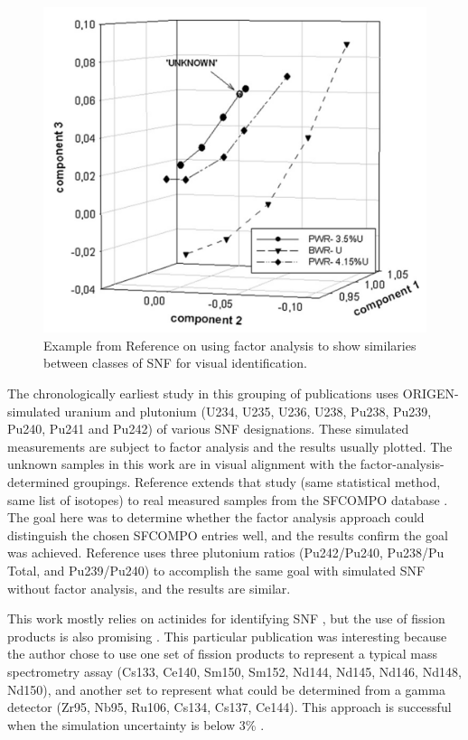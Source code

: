 \begin{figure}[!htb]
  \centering
  \includegraphics[width=0.5\linewidth]{./chapters/litrev/nicolaou.png}
  \caption{Example from Reference \cite{nicolaou_pu} on using factor analysis 
           to show similaries between classes of \gls{SNF} for visual 
           identification.}
  \label{fig:nico}
\end{figure}

The chronologically earliest study in this grouping of publications
\cite{nicolaou_2006} uses \gls{ORIGEN}-simulated uranium and plutonium (U234,
U235, U236, U238, Pu238, Pu239, Pu240, Pu241 and Pu242) of various \gls{SNF}
designations.  These simulated measurements are subject to factor analysis and
the results usually plotted.  The unknown samples in this work are in visual
alignment with the factor-analysis-determined groupings.  Reference
\cite{nicolaou_2014} extends that study (same statistical method, same list of
isotopes) to real measured samples from the \gls{SFCOMPO} database
\cite{sfcompo, valid_sfco}.  The goal here was to determine whether the factor
analysis approach could distinguish the chosen \gls{SFCOMPO} entries well, and
the results confirm the goal was achieved.  Reference \cite{nicolaou_2015} uses
three plutonium ratios (Pu242/Pu240, Pu238/Pu Total, and Pu239/Pu240) to
accomplish the same goal with simulated \gls{SNF} without factor analysis, and
the results are similar. 

This work mostly relies on actinides for identifying \gls{SNF}
\cite{nicolaou_2006, nicolaou_pu, nicolaou_2014, nicolaou_2015}, but the use of
fission products is also promising \cite{nicolaou_2009}.  This particular
publication was interesting because the author chose to use one set of fission
products to represent a typical mass spectrometry assay (Cs133, Ce140, Sm150,
Sm152, Nd144, Nd145, Nd146, Nd148, Nd150), and another set to represent what
could be determined from a gamma detector (Zr95, Nb95, Ru106, Cs134, Cs137,
Ce144).  This approach is successful when the simulation uncertainty is below
3\% \cite{nicolaou_2009}.

